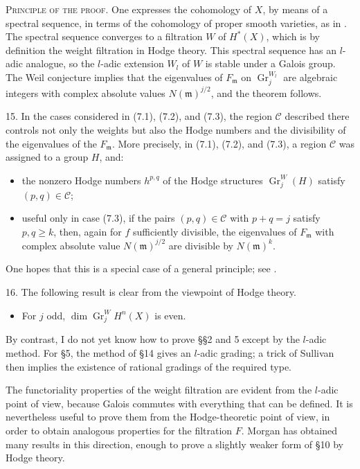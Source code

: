 \documentclass[10pt]{amsart}
\theoremstyle{plain}
\theoremstyle{definition}
\theoremstyle{remark}
\DeclareMathOperator{\Gr}{Gr}
\begin{document}
\textsc{Principle of the proof.} One expresses the cohomology of $X$, by means of a spectral sequence, in terms of the cohomology of proper smooth varieties, as in \cite{D1}. The spectral sequence converges to a filtration $W$ of $H^*(X)$, which is by definition the weight filtration in Hodge theory. This spectral sequence has an $l$-adic analogue, so the $l$-adic extension $W_l$ of $W$ is stable under a Galois group. The Weil conjecture implies that the eigenvalues of $F_{\mathfrak m}$ on $\Gr_j^{W_l}$ are algebraic integers with complex absolute values $N(\mathfrak m)^{j/2}$, and the theorem follows.

15. In the cases considered in (7.1), (7.2), and (7.3), the region $\mathscr C$ described there controls not only the weights but also the Hodge numbers and the divisibility of the eigenvalues of the $F_{\mathfrak m}$. More precisely, in (7.1), (7.2), and (7.3), a region $\mathscr C$ was assigned to a group $H$, and:
\begin{itemize}
\item[(a)] the nonzero Hodge numbers $h^{p,q}$ of the Hodge structures $\Gr_j^W(H)$ satisfy $(p,q)\in\mathscr C$;
\item[(b)] useful only in case (7.3), if the pairs $(p,q)\in\mathscr C$ with $p+q=j$ satisfy $p,q\ge k$, then, again for $f$ sufficiently divisible, the eigenvalues of $F_{\mathfrak m}$ with complex absolute value $N(\mathfrak m)^{j/2}$ are divisible by $N(\mathfrak m)^k$.
\end{itemize}
One hopes that this is a special case of a general principle; see \cite{M}.

16. The following result is clear from the viewpoint of Hodge theory.
\begin{itemize}
\item[(16.1)] For $j$ odd, $\dim\Gr_j^W H^n(X)$ is even.
\end{itemize}
By contrast, I do not yet know how to prove \S\S 2 and 5 except by the $l$-adic method. For \S 5, the method of \S 14 gives an $l$-adic grading; a trick of Sullivan then implies the existence of rational gradings of the required type.

The functoriality properties of the weight filtration are evident from the $l$-adic point of view, because Galois commutes with everything that can be defined. It is nevertheless useful to prove them from the Hodge-theoretic point of view, in order to obtain analogous properties for the filtration $F$. Morgan has obtained many results in this direction, enough to prove a slightly weaker form of \S 10 by Hodge theory.
\end{document}

